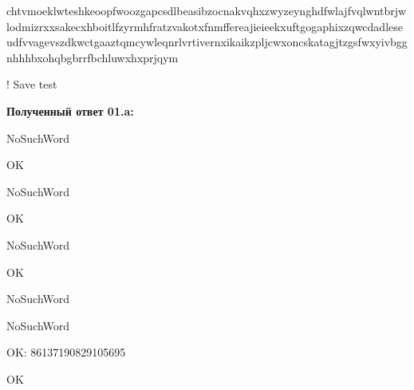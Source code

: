 chtvmoeklwteshkeoopfwoozgapcsdlbeasibzocnakvqhxzwyzeynghdfwlajfvqlwntbrjwlodmizrxxsakecxhboitlfzyrmhfratzvakotxfnmffereajieieekxuftgogaphixzqwcdadleseudfvvagevszdkwctgaaztqmcywleqnrlvrtivernxikaikzpljcwxoncskatagjtzgsfwxyivbggnhhhbxohqbgbrrfbchluwxhxprjqym

! Save test

\textbf{Полученный ответ 01.a:}

NoSuchWord

OK

NoSuchWord

OK

NoSuchWord

OK

NoSuchWord

NoSuchWord

OK: 86137190829105695

OK

\pagebreak

